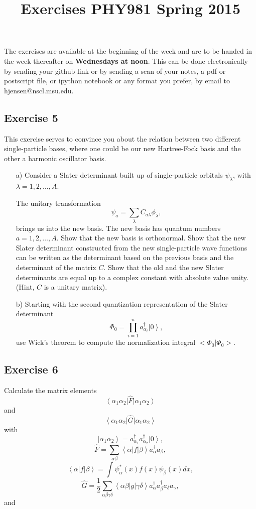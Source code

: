 \documentclass[prc]{revtex4}
\newcommand{\bra}[1]{\left\langle #1 \right|}
\newcommand{\ket}[1]{\left| #1 \right\rangle}
\begin{document}
\title{Exercises PHY981 Spring 2015}
\maketitle
The exercises are available at the beginning of the 
week and are  to be handed in 
the week thereafter on {\bf Wednesdays at noon}. This can be done electronically by sending your github link or by sending a scan of your notes, a pdf or postscript file, or ipython notebook or any format you prefer,  by email to 
hjensen@nscl.msu.edu. 



\subsection*{Exercise 5}
This exercise serves to convince you about the relation between
two different single-particle bases, where one could be our new Hartree-Fock basis and the other a harmonic oscillator basis.
\begin{enumerate}
\item[a)]
Consider a Slater determinant built up of single-particle orbitals $\psi_{\lambda}$, 
with $\lambda = 1,2,\dots,A$.

The unitary transformation
\[
\psi_a  = \sum_{\lambda} C_{a\lambda}\phi_{\lambda},
\]
brings us into the new basis.  
The new basis has quantum numbers $a=1,2,\dots,A$.
Show that the new basis is orthonormal.
Show that the new Slater determinant constructed from the new single-particle wave functions can be
written as the determinant based on the previous basis and the determinant of the matrix $C$.
Show that the old and the new Slater determinants are equal up to a complex constant with absolute value unity.
(Hint, $C$ is a unitary matrix). 
\item[b)]  Starting with the second quantization representation of the Slater determinant 
\[
\Phi_{0}=\prod_{i=1}^{n}a_{\alpha_{i}}^{\dagger}\ket{0},
\]
use Wick's theorem to compute the normalization integral
$<\Phi_{0}|\Phi_{0}>$.

\end{enumerate}

\subsection*{Exercise 6}

Calculate the matrix elements
\[
\bra{\alpha_{1}\alpha_{2}}\hat{F}\ket{\alpha_{1}\alpha_{2}}
\]
and
\[
\bra{\alpha_{1}\alpha_{2}}\hat{G}\ket{\alpha_{1}\alpha_{2}}
\]
with
\[
\ket{\alpha_{1}\alpha_{2}}=a_{\alpha_{1}}^{\dagger}
a_{\alpha_{2}}^{\dagger}\ket{0} ,
\]
\[
\hat{F}=\sum_{\alpha\beta}\bra{\alpha}f\ket{\beta}
a_{\alpha}^{\dagger}a_{\beta}  ,
\]
\[
\bra{\alpha}f\ket{\beta}=\int \psi_{\alpha}^{*}(x)f(x)\psi_{\beta}(x)dx ,
\]
\[
\hat{G} = \frac{1}{2}\sum_{\alpha\beta\gamma\delta}
\bra{\alpha\beta}g\ket{\gamma\delta}
a_{\alpha}^{\dagger}a_{\beta}^{\dagger}a_{\delta}a_{\gamma} ,
\]
and
\end{document}
